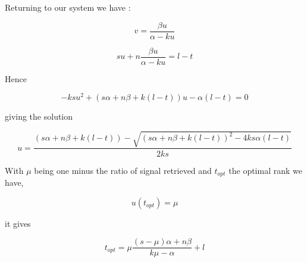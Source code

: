 \documentclass[a4paper]{article}
\begin{document}
Returning to our system we have :

\begin{equation}
    v = \frac{\beta u}{\alpha-ku}
\end{equation}

\begin{equation}
    s u + n \frac{\beta u}{\alpha-ku}  = l-t
\end{equation}

Hence

\begin{equation}
    -ksu^2+(s\alpha+n\beta+k(l-t))u-\alpha(l-t) = 0
\end{equation}

giving the solution

\begin{equation}
    u = \frac{(s\alpha+n\beta+k(l-t))-\sqrt{(s\alpha+n\beta+k(l-t))^2-4ks\alpha(l-t)}}{2ks}
\end{equation}

With $\mu$ being one minus the ratio of signal retrieved and $t_{opt}$ the optimal rank we have,

\begin{equation}
      u(t_{opt}) =  \mu 
\end{equation}

it gives

\begin{equation}
    t_{opt} = \mu\frac{(s-\mu)\alpha + n\beta}{k\mu-\alpha}+l
\end{equation}




\end{document}
